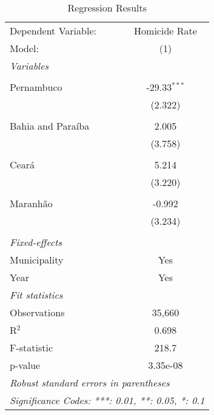 \documentclass{article}
\begin{document}
\begin{table}[H]
   \caption{Regression Results}
   \centering
   \begin{tabular}{lc}
      \toprule \toprule
      Dependent Variable: & \multicolumn{1}{c}{Homicide Rate} \\
      Model:              & (1) \\  
      \midrule
      \emph{Variables} \\\\
      Pernambuco             & -29.33$^{***}$ \\
                          & (2.322) \\\\
      Bahia and Paraíba         &  2.005 \\
                          & (3.758) \\\\
      Ceará             & 5.214 \\
                          & (3.220) \\\\
      Maranhão             & -0.992 \\
                          & (3.234) \\\\
      \midrule
      \emph{Fixed-effects} \\
      Municipality        & Yes \\
      Year                & Yes \\
      \midrule
      \emph{Fit statistics} \\
      Observations        & 35,660 \\
      R$^2$               & 0.698 \\
      F-statistic         & 218.7 \\
      p-value             & 3.35e-08 \\
      \midrule \midrule
      \multicolumn{2}{l}{\emph{Robust standard errors in parentheses}} \\
      \multicolumn{2}{l}{\emph{Significance Codes: ***: 0.01, **: 0.05, *: 0.1}} \\
   \end{tabular}
\end{table}
\end{document}
